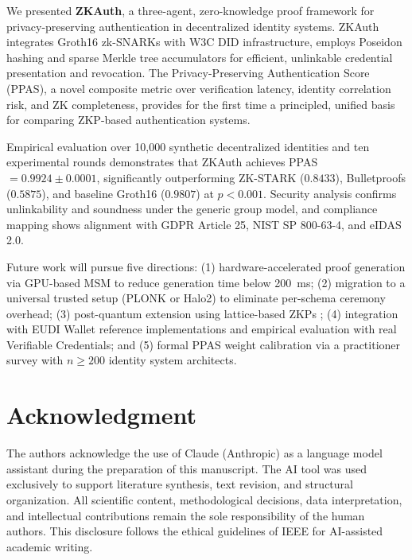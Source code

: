 \documentclass[journal,12pt,onecolumn]{IEEEtran}
\begin{document}
We presented \textbf{ZKAuth}, a three-agent, zero-knowledge proof
framework for privacy-preserving authentication in decentralized identity
systems. ZKAuth integrates Groth16 zk-SNARKs with W3C DID infrastructure,
employs Poseidon hashing and sparse Merkle tree accumulators for
efficient, unlinkable credential presentation and revocation. The
Privacy-Preserving Authentication Score (PPAS), a novel composite metric
over verification latency, identity correlation risk, and ZK completeness,
provides for the first time a principled, unified basis for comparing
ZKP-based authentication systems.

Empirical evaluation over 10,000 synthetic decentralized identities and
ten experimental rounds demonstrates that ZKAuth achieves PPAS $= 0.9924
\pm 0.0001$, significantly outperforming ZK-STARK ($0.8433$),
Bulletproofs ($0.5875$), and baseline Groth16 ($0.9807$) at $p < 0.001$.
Security analysis confirms unlinkability and soundness under the generic
group model, and compliance mapping shows alignment with GDPR Article 25,
NIST SP 800-63-4, and eIDAS 2.0.

Future work will pursue five directions: (1) hardware-accelerated proof
generation via GPU-based MSM to reduce generation time below 200~ms;
(2) migration to a universal trusted setup (PLONK or Halo2) to eliminate
per-schema ceremony overhead; (3) post-quantum extension using
lattice-based ZKPs \cite{zhou2025lattice,chase2017post}; (4) integration
with EUDI Wallet reference implementations and empirical evaluation with
real Verifiable Credentials; and (5) formal PPAS weight calibration via
a practitioner survey with $n \geq 200$ identity system architects.

\section*{Acknowledgment}

The authors acknowledge the use of Claude (Anthropic) as a language
model assistant during the preparation of this manuscript. The AI tool
was used exclusively to support literature synthesis, text revision,
and structural organization. All scientific content, methodological
decisions, data interpretation, and intellectual contributions remain
the sole responsibility of the human authors. This disclosure follows
the ethical guidelines of IEEE for AI-assisted academic writing.
\end{document}
